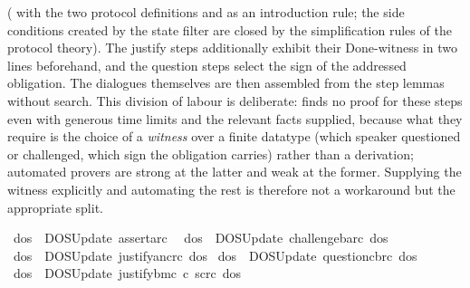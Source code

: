 \begin{isabellebody}
\begin{isamarkuptext}
( with the two protocol definitions and  as an introduction
rule; the side conditions created by the state filter are closed by the
 simplification rules of the protocol theory). The justify steps
additionally exhibit their Done-witness in two lines beforehand, and the question
steps select the sign of the addressed obligation. The dialogues themselves are
then assembled from the step lemmas without search.
This division of labour is deliberate:  \cite{Sledgehammer2011}
finds no proof for these steps even with generous time limits and the relevant
facts supplied, because what they require is the choice of a \emph{witness} over a
finite datatype (which speaker questioned or challenged, which sign the
obligation carries) rather than a derivation; automated provers are strong at
the latter and weak at the former. Supplying the witness explicitly and
automating the rest is therefore not a workaround but the appropriate split.%
\end{isamarkuptext}\isamarkuptrue%
\isamarkupfalse%
\ {\isachardoublequoteopen}dos\ {\isasymequiv}\ DOSUpdate\ assert{\isacharbrackleft}{\kern0pt}a{\isacharcomma}{\kern0pt}r\isactrlsup c{\isacharbrackright}{\kern0pt}\ {\isacharbrackleft}{\kern0pt}{\isacharbrackright}{\kern0pt}{\isachardoublequoteclose}\isanewline
{}\isamarkupfalse%
\ {\isachardoublequoteopen}dos\ {\isasymequiv}\ DOSUpdate\ challenge{\isacharbrackleft}{\kern0pt}b{\isacharcomma}{\kern0pt}a{\isacharcomma}{\kern0pt}r\isactrlsup c{\isacharbrackright}{\kern0pt}\ dos\isanewline
{}\isamarkupfalse%
\ {\isachardoublequoteopen}dos\ {\isasymequiv}\ DOSUpdate\ justify{\isacharbrackleft}{\kern0pt}a{\isacharcomma}{\kern0pt}n\isactrlsup c{\isasymturnstile}\isactrlsup {\isasymoplus}r\isactrlsup c{\isacharbrackright}{\kern0pt}\ dos\isanewline
{}\isamarkupfalse%
\ {\isachardoublequoteopen}dos\ {\isasymequiv}\ DOSUpdate\ question{\isacharbrackleft}{\kern0pt}c{\isacharcomma}{\kern0pt}b{\isacharcomma}{\kern0pt}r\isactrlsup c{\isacharbrackright}{\kern0pt}\ dos\isanewline
{}\isamarkupfalse%
\ {\isachardoublequoteopen}dos\ {\isasymequiv}\ DOSUpdate\ justify{\isacharbrackleft}{\kern0pt}b{\isacharcomma}{\kern0pt}m\isactrlsup c\ {\isasymand}\isactrlsup c\ s\isactrlsup c{\isasymturnstile}\isactrlsup {\isasymominus}r\isactrlsup c{\isacharbrackright}{\kern0pt}\ dos\isanewline

\end{isabellebody}
